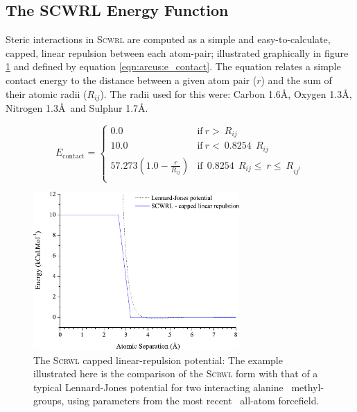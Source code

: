 \subsection{The SCWRL Energy Function}
\label{section:arcus:scwrl_energy}

Steric interactions in \textsc{Scwrl} are computed as a simple and easy-to-calculate, capped, linear repulsion between each atom-pair; illustrated graphically in figure \ref{figure:arcus:scwrl:pair_energy} and defined by equation \ref{eqn:arcus:e_contact}.
The equation relates a simple contact energy to the distance between a given atom pair ($r$) and the sum of their atomic radii ($R_{ij}$).
The radii used for this were: Carbon 1.6\AA, Oxygen 1.3\AA, Nitrogen 1.3\AA\ and Sulphur 1.7\AA.

\begin{equation}
E_\text{contact} =  \left\{ \begin{array}{ll}
 0.0 & \text{if}\ r >\ R_{ij}\\
10.0 & \text{if}\ r <\ 0.8254\:\ R_{ij}\\ 
57.273 \left( 1.0 - \displaystyle \frac{r}{R_{ij}} \right) & \text{if}\  \ 0.8254\:\ R_{ij} \leq\ r \leq\ R_{ij^{i}} \\
\end{array}
\right.
\label{eqn:arcus:e_contact}
\end{equation}

\begin{figure}[hbtp]
\begin{center}
\includegraphics[width=0.7\textwidth]{./09-Arcus/scwrl/atom_interact.pdf}
\caption[The SCWRL capped linear-repulstion potential]{The \textsc{Scrwl} capped linear-repulsion potential: The example illustrated here is the comparison of the \textsc{Scrwl} form with that of a typical Lennard-Jones potential for two interacting alanine \sidechain\ methyl-groups, using parameters from the most recent \amber\ all-atom forcefield.}
\label{figure:arcus:scwrl:pair_energy}
\end{center}
\end{figure}

